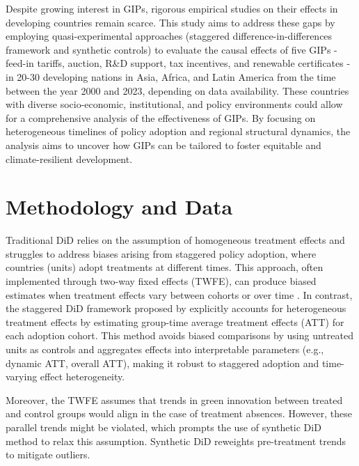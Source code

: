 \documentclass[12pt]{article}
\begin{document}
Despite growing interest in GIPs, rigorous empirical studies on their effects in developing countries remain scarce. This study aims to address these gaps by employing quasi-experimental approaches (staggered difference-in-differences framework and synthetic controls) to evaluate the causal effects of five GIPs - feed-in tariffs, auction, R\&D support, tax incentives, and renewable certificates - in 20-30 developing nations in Asia, Africa, and Latin America from the time between the year 2000 and 2023, depending on data availability. These countries with diverse socio-economic, institutional, and policy environments could allow for a comprehensive analysis of the effectiveness of GIPs. By focusing on heterogeneous timelines of policy adoption and regional structural dynamics, the analysis aims to uncover how GIPs can be tailored to foster equitable and climate-resilient development.

\section{Methodology and Data}

Traditional DiD relies on the assumption of homogeneous treatment effects and struggles to address biases arising from staggered policy adoption, where countries (units) adopt treatments at different times. This approach, often implemented through two-way fixed effects (TWFE), can produce biased estimates when treatment effects vary between cohorts or over time \parencite{Baker2022}. In contrast, the staggered DiD framework proposed by \textcite{Callaway2021} explicitly accounts for heterogeneous treatment effects by estimating group-time average treatment effects (ATT) for each adoption cohort. This method avoids biased comparisons by using untreated units as controls and aggregates effects into interpretable parameters (e.g., dynamic ATT, overall ATT), making it robust to staggered adoption and time-varying effect heterogeneity.

Moreover, the TWFE assumes that trends in green innovation between treated and control groups would align in the case of treatment absences. However, these parallel trends might be violated, which prompts the use of synthetic DiD method \parencite{Arkhangelsky2021} to relax this assumption. Synthetic DiD reweights pre-treatment trends to mitigate outliers.
\end{document}
